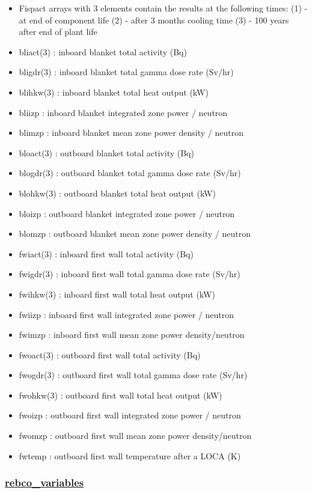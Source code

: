 \documentclass[]{article}
\providecommand{\tightlist}{%
  \setlength{\itemsep}{0pt}\setlength{\parskip}{0pt}}
\begin{document}
\begin{itemize}
\tightlist
\item
  Fispact arrays with 3 elements contain the results at the following
  times: (1) - at end of component life (2) - after 3 months cooling
  time (3) - 100 years after end of plant life
\item
  bliact(3) : inboard blanket total activity (Bq)
\item
  bligdr(3) : inboard blanket total gamma dose rate (Sv/hr)
\item
  blihkw(3) : inboard blanket total heat output (kW)
\item
  bliizp : inboard blanket integrated zone power / neutron
\item
  blimzp : inboard blanket mean zone power density / neutron
\item
  bloact(3) : outboard blanket total activity (Bq)
\item
  blogdr(3) : outboard blanket total gamma dose rate (Sv/hr)
\item
  blohkw(3) : outboard blanket total heat output (kW)
\item
  bloizp : outboard blanket integrated zone power / neutron
\item
  blomzp : outboard blanket mean zone power density / neutron
\item
  fwiact(3) : inboard first wall total activity (Bq)
\item
  fwigdr(3) : inboard first wall total gamma dose rate (Sv/hr)
\item
  fwihkw(3) : inboard first wall total heat output (kW)
\item
  fwiizp : inboard first wall integrated zone power / neutron
\item
  fwimzp : inboard first wall mean zone power density/neutron
\item
  fwoact(3) : outboard first wall total activity (Bq)
\item
  fwogdr(3) : outboard first wall total gamma dose rate (Sv/hr)
\item
  fwohkw(3) : outboard first wall total heat output (kW)
\item
  fwoizp : outboard first wall integrated zone power / neutron
\item
  fwomzp : outboard first wall mean zone power density/neutron
\item
  fwtemp : outboard first wall temperature after a LOCA (K)
\end{itemize}

\hypertarget{rebco_variables}{%
\subsubsection{\texorpdfstring{\href{rebco_variables.html}{rebco\_variables}}{rebco\_variables}}\label{rebco_variables}}
\end{document}

